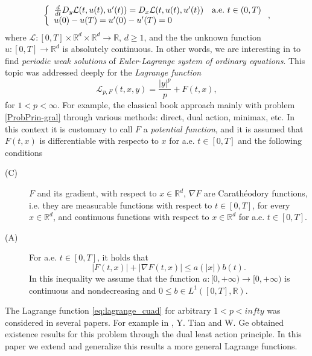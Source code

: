 \documentclass[twoside]{article}
\theoremstyle{remark}
\newcommand{\rr}{\mathbb{R}}
\renewcommand{\leq}{\leqslant}
\renewcommand{\geq}{\geqslant}
\newcounter{example}
\begin{document}
\begin{equation}\label{ProbPrin-gral}
    \left\{%
\begin{array}{ll}
  \frac{d}{dt} D_{y}\mathcal{L}(t,u(t),u'(t))= D_{x}\mathcal{L}(t,u(t),u'(t)) \quad \hbox{a.e.}\ t \in (0,T)\\
    u(0)-u(T)=u'(0)-u'(T)=0
\end{array}%
\right.,
\end{equation}
where $\mathcal{L}:[0,T]\times\rr^d\times\rr^d\to\rr$, $d\geq 1$, and the the unknown function  $u:[0,T]\to\rr^d$ is absolutely continuous. In other words, we are interesting in to find \emph{periodic weak solutions} of \emph{Euler-Lagrange system of ordinary equations}. This topic    was addressed deeply for the \emph{Lagrange function}
\begin{equation}\label{eq:lagrange_cuad}
\mathcal{L}_{p,F}(t,x,y)=\frac{|y|^p}{p}+F(t,x),
\end{equation}
for $1<p<\infty$. For example, the classical book  \cite{mawhin2010critical} approach mainly with problem \eqref{ProbPrin-gral} through various methods: direct, dual action, minimax, etc. In this context  it is customary to call $F$ a  \emph{potential function}, and it is assumed that $F(t,x)$ is differentiable with respecto to $x$ for a.e. $t\in [0,T]$ and the following conditions
\begin{description}

 \item[(C)]\label{item:condicion_c} $F$ and its gradient, with respect to $x\in\rr^d$, $\nabla F$ are  Carath\'eodory functions, i.e. they are measurable functions with respect to $t\in [0,T]$, for every  $x\in\rr^d$, and   continuous functions with  respect to  $x\in\rr^d$ for a.e. $t \in [0,T]$.

 \item[(A)]\label{item:condicion_a}  For   a.e. $t\in [0,T]$, it holds that
\begin{equation}
|F(t,x)| + |\nabla F(t,x)|  \leq a(|x|)b(t).
\end{equation}
In this inequality we assume that the function  $a:[0,+\infty)\to [0,+\infty)$ is continuous and nondecreasing and $0\leq b\in L^1([0,T],\rr)$.
\end{description}

The Lagrange function \eqref{eq:lagrange_cuad} for arbitrary $1<p<infty$ was considered in several papers. For example in \cite{Tian2007192}, Y. Tian and W. Ge obtained existence results for this problem through the  dual least action principle. In this paper we extend and generalize this results a more general Lagrange functions. 
\end{document}

